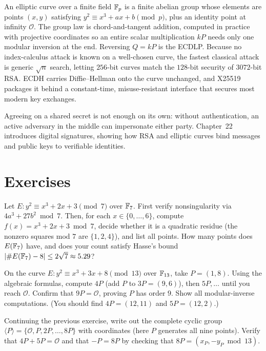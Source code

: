 An elliptic curve over a finite field $\mathbb{F}_p$ is a finite abelian group whose elements are
points $(x,y)$ satisfying $y^2 \equiv x^3 + ax + b \pmod p$, plus an identity point at
infinity $\mathcal{O}$. The group law is chord-and-tangent addition, computed in practice
with projective coordinates so an entire scalar multiplication $kP$ needs only one modular
inversion at the end. Reversing $Q = kP$ is the ECDLP. Because no index-calculus attack is
known on a well-chosen curve, the fastest classical attack is generic $\sqrt{n}$ search,
letting $256$-bit curves match the $128$-bit security of $3072$-bit RSA. ECDH carries
Diffie--Hellman onto the curve unchanged, and X25519 packages it behind a constant-time,
misuse-resistant interface that secures most modern key exchanges.

Agreeing on a shared secret is not enough on its own: without authentication, an active
adversary in the middle can impersonate either party. Chapter~22 introduces digital
signatures, showing how RSA and elliptic curves bind messages and public keys to
verifiable identities.

\section{Exercises}
\label{ch21:exercises}

\begin{exercise}
\label{ch21:ex-count}
Let $E: y^2 \equiv x^3 + 2x + 3 \pmod 7$ over $\mathbb{F}_7$. First verify nonsingularity via
$4a^3 + 27b^2 \bmod 7$. Then, for each $x \in \{0,\dots,6\}$, compute $f(x)=x^3+2x+3
\bmod 7$, decide whether it is a quadratic residue (the nonzero squares mod $7$ are
$\{1,2,4\}$), and list all points. How many points does $E(\mathbb{F}_7)$ have, and does your
count satisfy Hasse's bound $\lvert\#E(\mathbb{F}_7) - 8\rvert \le 2\sqrt 7 \approx 5.29$?
\end{exercise}

\begin{exercise}
\label{ch21:ex-add}
On the curve $E: y^2 \equiv x^3 + 3x + 8 \pmod{13}$ over $\mathbb{F}_{13}$, take $P=(1,8)$. Using
the algebraic formulas, compute $4P$ (add $P$ to $3P=(9,6)$), then $5P,\dots$ until you
reach $\mathcal{O}$. Confirm that $9P = \mathcal{O}$, proving $P$ has order $9$. Show all
modular-inverse computations. (You should find $4P=(12,11)$ and $5P=(12,2)$.)
\end{exercise}

\begin{exercise}
\label{ch21:ex-subgroup}
Continuing the previous exercise, write out the complete cyclic group
$\langle P\rangle = \{\mathcal{O}, P, 2P, \dots, 8P\}$ with coordinates (here $P$
generates all nine points). Verify that $4P + 5P = \mathcal{O}$ and that $-P = 8P$ by
checking that $8P = (x_P, -y_P \bmod 13)$.
\end{exercise}

